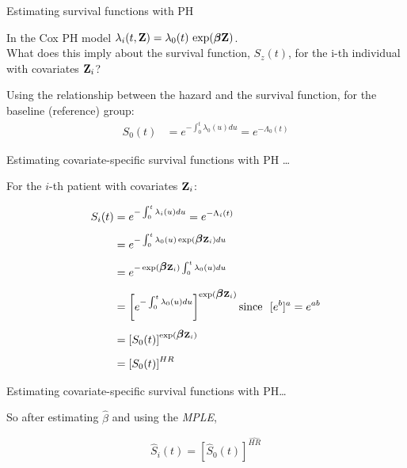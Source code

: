 \documentclass[ignorenonframetext,]{beamer}
\newcommand{\bbeta}{\mbox{\boldmath$\beta$}}
\begin{document}
\begin{frame}{%
\protect\hypertarget{estimating-survival-functions-with-ph}{%
Estimating survival functions with PH}}

In the Cox PH model
\(\lambda_i(t,{\bf Z})=\lambda_0(t) \,\exp(\bbeta {\bf Z})\).\\
What does this imply about the survival function, \(S_z(t)\), for the
i-th individual with covariates \({\bf Z}_i\)?

Using the relationship between the hazard and the survival function, for
the baseline (reference) group: \begin{align*}
S_0(t) &= e^{- \int_0^t \lambda_0(u) du} = e^{-\Lambda_0(t)}
\end{align*}

\end{frame}

\begin{frame}{%
\protect\hypertarget{estimating-covariate-specific-survival-functions-with-ph}{%
Estimating covariate-specific survival functions with PH \dots}}

For the \(i\)-th patient with covariates \({\bf Z}_i\):

\begin{align*}
S_i(t) &= e^{- \int_0^t \lambda_i(u) du} = e^{-\Lambda_i(t)}
 \\[1ex]
       &= e^{- \int_0^t \lambda_0(u) \exp(\bbeta {\bf Z}_i) du}
 \\[1ex]
       &= e^{- \exp(\bbeta {\bf Z}_i) \int_0^t \lambda_0(u) du}
\nonumber  \\[1ex]
       &= \left[e^{- \int_0^t \lambda_0(u) du}\right]^{\exp(\bbeta {\bf Z}_i)}
\text{since~~} [e^b]^a = e^{ab} \\[1ex]
       &= \left[S_0(t)\right]^{\exp(\bbeta {\bf Z}_i)}\\[1ex]
       &= \left[S_0(t)\right]^{HR}
\end{align*}

\end{frame}

\begin{frame}{%
\protect\hypertarget{estimating-covariate-specific-survival-functions-with-ph-1}{%
Estimating covariate-specific survival functions with PH\ldots}}

So after estimating \(\widehat{\beta}\) and using the \emph{MPLE},

\[\widehat{S}_i(t) = \left[\widehat{S}_0(t)\right]^{\widehat{HR}}\]

\end{frame}
\end{document}
